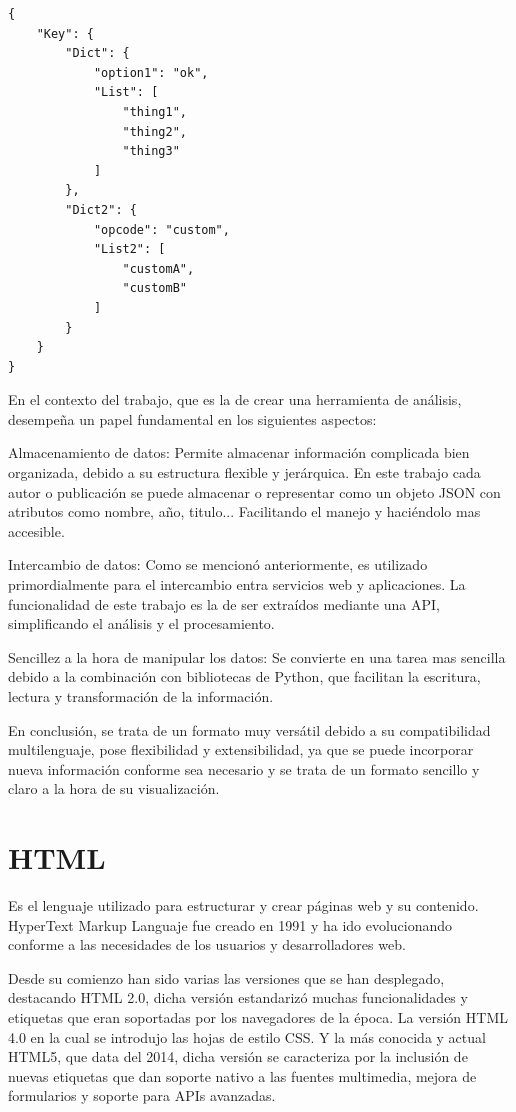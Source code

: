 \documentclass[a4paper, 12pt]{book}
\begin{document}
\begin{lstlisting}
{
    "Key": {
        "Dict": {
            "option1": "ok",
            "List": [
                "thing1",
                "thing2",
                "thing3"
            ]
        },
        "Dict2": {
            "opcode": "custom",
            "List2": [
                "customA",
                "customB"
            ]
        }
    }
}
\end{lstlisting}

En el contexto del trabajo, que es la de crear una herramienta de análisis, desempeña un papel fundamental en los siguientes aspectos:

Almacenamiento de datos: Permite almacenar información complicada bien organizada, debido a su estructura flexible y jerárquica. En este trabajo cada autor o publicación se puede almacenar o representar como un objeto JSON con atributos como nombre, año, titulo... Facilitando el manejo y haciéndolo mas accesible.

Intercambio de datos: Como se mencionó anteriormente, es utilizado primordialmente para el intercambio entra servicios web y aplicaciones. La funcionalidad de este trabajo es la de ser extraídos mediante una API, simplificando el análisis y el procesamiento.

Sencillez a la hora de manipular los datos: Se convierte en una tarea mas sencilla debido a la combinación con bibliotecas de Python, que facilitan la escritura, lectura y transformación de la información. 

En conclusión, se trata de un formato muy versátil debido a su compatibilidad multilenguaje, pose flexibilidad y extensibilidad, ya que se puede incorporar nueva información conforme sea necesario y se trata de un formato sencillo y claro a la hora de su visualización.


\section{HTML}

Es el lenguaje utilizado para estructurar y crear páginas web y su contenido. HyperText Markup Languaje fue creado en 1991 y ha ido evolucionando conforme a las necesidades de los usuarios y desarrolladores web.

Desde su comienzo han sido varias las versiones que se han desplegado, destacando HTML 2.0, dicha versión estandarizó muchas funcionalidades y etiquetas que eran soportadas por los navegadores de la época. La versión HTML 4.0 en la cual se introdujo las hojas de estilo CSS. Y la más conocida y actual HTML5, que data del 2014, dicha versión se caracteriza por la inclusión de nuevas etiquetas que dan soporte nativo a las fuentes multimedia, mejora de formularios y soporte para APIs avanzadas.
\end{document}
